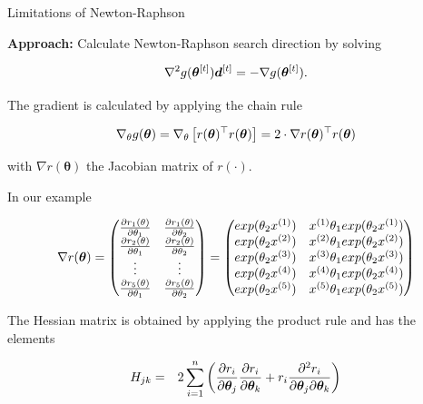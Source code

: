\documentclass[11pt,compress,t,notes=noshow, xcolor=table]{beamer}
\begin{document}
\begin{vbframe}{Limitations of Newton-Raphson}


\textbf{Approach:} Calculate Newton-Raphson search direction by solving

$$
\nabla^2 g(\bm{\theta}^{[t]}) \bm{d}^{[t]} = - \nabla g(\bm{\theta}^{[t]}).
$$

The gradient is calculated by applying the chain rule

$$
	\nabla_\theta g(\bm{\theta}) = \nabla_\theta \left[r(\bm{\theta})^\top r(\bm{\theta})\right] = 2 \cdot  \nabla r(\bm{\theta})^\top r(\bm{\theta})
$$

with $\nabla r(\bm{\theta})$ the Jacobian matrix of $r(\cdot)$.

\lz

In our example

\begin{footnotesize}
$$
\nabla r(\bm{\theta}) = \begin{pmatrix} \frac{\partial r_1(\theta)}{\partial \theta_1} & \frac{\partial r_1(\theta)}{\partial \theta_2}\\
\frac{\partial r_2(\theta)}{\partial \theta_1} & \frac{\partial r_2(\theta)}{\partial \theta_2}\\
\vdots & \vdots \\
\frac{\partial r_5(\theta)}{\partial \theta_1} & \frac{\partial r_5(\theta)}{\partial \theta_2} \end{pmatrix} 
= \begin{pmatrix} exp(\theta_2 x^{(1)}) & x^{(1)} \theta_ 1 exp(\theta_2 x^{(1)}) \\ exp(\theta_2 x^{(2)}) & x^{(2)} \theta_ 1 exp(\theta_2 x^{(2)})\\ exp(\theta_2 x^{(3)}) & x^{(3)} \theta_1 exp(\theta_2 x^{(3)}) \\ exp(\theta_2 x^{(4)}) & x^{(4)} \theta_1 exp(\theta_2 x^{(4)}) \\ exp(\theta_2 x^{(5)}) & x^{(5)} \theta_1 exp(\theta_2 x^{(5)}) \end{pmatrix} 
$$
\end{footnotesize}

\framebreak 

The Hessian matrix is obtained by applying the product rule and has the elements

\begin{eqnarray*}
	H_{jk} &=& 2 \sum\limits_{i=1}^n \left(\frac{\partial r_i}{\partial \bm{\theta}_j}\frac{\partial r_i}{\partial \bm{\theta}_k} + r_i \frac{\partial^2 r_i}{\partial \bm{\theta}_j \partial \bm{\theta}_k}\right)
\end{eqnarray*}


\end{vbframe}
\end{document}
